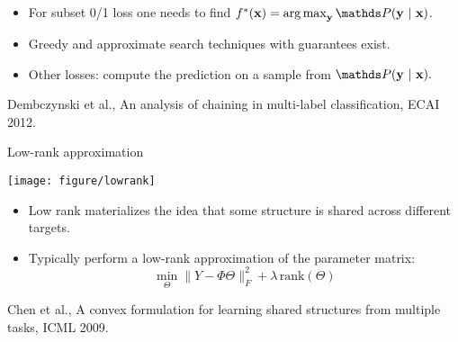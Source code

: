 \documentclass[11pt,compress,t,notes=noshow, xcolor=table]{beamer}
\begin{document}
\begin{frame}[fragile]
	\vspace{0.1cm}
	\begin{itemize}\small
		\item For subset 0/1 loss one needs to find $
		\fbayes(\xv) = \argmax_{\yv} \P(\yv ~|~ \xv)
		$.
		\item Greedy and approximate search techniques with guarantees exist.
		\item Other losses: compute the prediction on a sample from $\P(\yv ~|~  \xv).$
	\end{itemize}
{\tiny Dembczynski et al., An analysis of chaining in multi-label classification, ECAI 2012.}
	
\end{frame}



\begin{frame}{Low-rank approximation}
	
	\begin{center}
		\texttt{[image: figure/lowrank]}
	\end{center}

	\begin{itemize}
%		
		\item Low rank materializes the idea that some structure is shared across different targets.
%
		\item 	Typically perform a low-rank approximation of the parameter matrix:
		$$\min_\Theta \|Y - \Phi \Theta \|^2_F + \lambda \, \mathrm{rank}(\Theta)$$
%		
	\end{itemize}
	{\tiny Chen et al., A convex formulation for learning shared structures from
	multiple tasks, ICML 2009.}
\end{frame}



\end{document}
